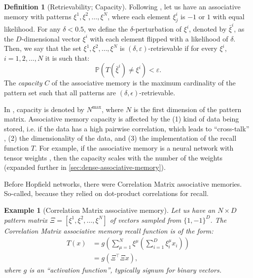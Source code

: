 \documentclass{article}
\newtheorem{example}{Example}[subsection]
\theoremstyle{definition}
\newtheorem{definition}{Definition}[subsection]
\begin{document}
\begin{definition}[Retrievability; Capacity]
  Following \textcite{bao_capacity_2022}, let us have an associative
  memory with patterns
  $\xi^1, \xi^2, \dots, \xi^N$, where each element $\xi^i_j$ is
  $-1$ or $1$ with equal likelihood. For any $\delta < 0.5$, we define
  the $\delta$-perturbation of $\xi^i$, denoted by $\bar \xi^i$, as
  the $D$-dimensional vector $\xi^i$ with each element flipped with a likelihood
  of $\delta$. Then, we say that the set $\xi^1, \xi^2, \dots, \xi^N$ is
  $(\delta, \varepsilon)$-retrievable if for every $\xi^i$, $i = 1, 2, \dots, N$
  it is such that:
  \begin{equation}
    \mathbb{P}(T(\bar \xi^i) \neq \xi^i) < \varepsilon.
  \end{equation}
  The \textit{capacity} $C$ of the associative memory is the maximum
  cardinality of the pattern set such that all patterns are $(\delta,
  \epsilon)$-retrievable.
\end{definition}

In \textcite{krotov_dense_2016}, capacity is denoted by $N^{\max}$, where
$N$ is the first dimension of the pattern matrix. Associative memory
capacity is affected by the (1) kind of data being stored,
i.e. if the data
has a high pairwise correlation, which leads to ``cross-talk''
\parencite{kohonen_correlation_1988},
(2) the dimensionality of the data, and (3) the implementation of the
recall function $T$.
For example, if the associative memory is a neural network with
tensor weights \parencite{kelly_memory_2017},
then the capacity scales with the number of the weights
\parencite{little_analytic_1978} (expanded
further in \autoref{sec:dense-associative-memory}).

Before Hopfield networks, there were Correlation Matrix associative memories.
So-called, because they relied on dot-product correlations for recall.
\begin{example}[Correlation Matrix associative
  memory]\label{example:correlation}
  Let us have an $N \times D$ pattern matrix $\Xi = [\xi^1, \xi^2,
  \dots, \xi^N]$ of
  vectors sampled from $\{1, -1\}^D$. The Correlation Matrix associative memory
  recall function is of the form:
  \begin{align}
    T(x) &= g \left(\sum^N_{\mu=1} \xi^\mu \left( \sum^D_{i=1}
    \xi^\mu_i x_i \right)\right) \nonumber \\
    &= g \left( \Xi^\top \Xi x  \right),
  \end{align}
  where $g$ is an ``activation function'', typically \textit{signum}
  for binary vectors.
\end{example}
\end{document}
